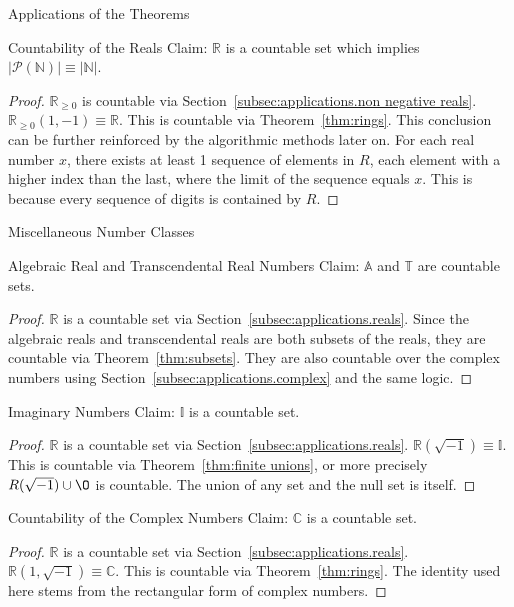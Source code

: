 \documentclass[12pt]{article}
\begin{document}
\begin{section}{Applications of the Theorems}
	\pagebreak\begin{subsection}{Countability of the Reals}\label{subsec:applications.reals}
		Claim: $\mathbb R$ is a countable set which implies
		$\left|\mathcal P(\mathbb N)\right|\equiv\left|\mathbb N\right|$.
		\begin{proof}
			$\mathbb R_{\ge 0}$ is countable via Section~\ref{subsec:applications.non negative reals}.
			$\mathbb R_{\ge0}(1, -1)\equiv\mathbb R$. This is countable via Theorem~\ref{thm:rings}.
			This conclusion can be further reinforced by the algorithmic methods later on. For each
			real number $x$, there exists at least 1 sequence of elements in $R$, each element with a
			higher index than the last, where the limit of the sequence equals $x$. This is because
			every sequence of digits is contained by $R$.
		\end{proof}
	\end{subsection}

	\begin{subsection}{Miscellaneous Number Classes}\label{subsec:applications.miscellaneous}
		\begin{subsubsection}{Algebraic Real and Transcendental Real Numbers}
			\label{subsubsec:applications.misc.reals}
			Claim: $\mathbb A$ and $\mathbb T$ are countable sets.
			\begin{proof}
				$\mathbb R$ is a countable set via Section~\ref{subsec:applications.reals}.
				Since the algebraic reals and transcendental reals are both subsets of the
				reals, they are countable via Theorem~\ref{thm:subsets}. They are also
				countable over the complex numbers using Section~\ref{subsec:applications.complex}
				and the same logic.
			\end{proof}
		\end{subsubsection}

		\begin{subsubsection}{Imaginary Numbers}\label{subsubsec:applications.misc.imaginary}
			Claim: $\mathbb I$ is a countable set.
			\begin{proof}
				$\mathbb R$ is a countable set via Section~\ref{subsec:applications.reals}.
				$\mathbb R(\sqrt{-1})\equiv\mathbb I$. This is countable via
				Theorem~\ref{thm:finite unions}, or more precisely $R(\sqrt{-1})\cup\O$
				is countable. The union of any set and the null set is itself.
			\end{proof}
		\end{subsubsection}
	\end{subsection}

	\begin{subsection}{Countability of the Complex Numbers}\label{subsec:applications.complex}
		Claim: $\mathbb C$ is a countable set.
		\begin{proof}
			$\mathbb R$ is a countable set via Section~\ref{subsec:applications.reals}.
			$\mathbb R(1, \sqrt{-1})\equiv\mathbb C$. This is countable via Theorem~\ref{thm:rings}.
			The identity used here stems from the rectangular form of complex numbers.
		\end{proof}
	\end{subsection}
\end{section}
\end{document}
